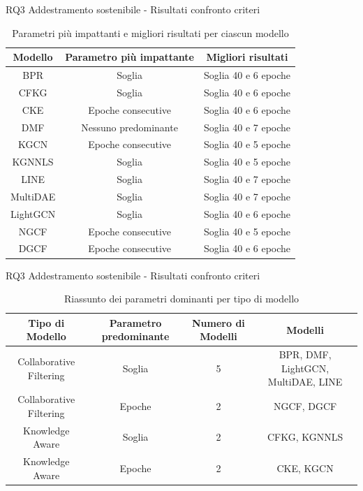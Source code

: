\begin{frame}{RQ3 Addestramento sostenibile - Risultati confronto criteri}
\begin{table}[H]
    \scriptsize
    \centering
    \begin{tabular}{|c|c|c|}
        \hline
        \textbf{Modello} & \textbf{Parametro più impattante} & \textbf{Migliori risultati} \\
        \hline
        BPR & Soglia & Soglia 40 e 6 epoche \\
        \hline
        CFKG & Soglia & Soglia 40 e 6 epoche \\
        \hline
        CKE & Epoche consecutive & Soglia 40 e 6 epoche \\
        \hline
        DMF & Nessuno predominante & Soglia 40 e 7 epoche \\
        \hline
        KGCN & Epoche consecutive & Soglia 40 e 5 epoche \\
        \hline
        KGNNLS & Soglia & Soglia 40 e 5 epoche \\
        \hline
        LINE & Soglia & Soglia 40 e 7 epoche \\
        \hline
        MultiDAE & Soglia & Soglia 40 e 7 epoche \\
        \hline
        LightGCN & Soglia & Soglia 40 e 6 epoche \\
        \hline
        NGCF & Epoche consecutive & Soglia 40 e 5 epoche \\
        \hline
        DGCF & Epoche consecutive & Soglia 40 e 6 epoche \\
        \hline
    \end{tabular}
    \caption{Parametri più impattanti e migliori risultati per ciascun modello}
\end{table}
\end{frame}


\begin{frame}{RQ3 Addestramento sostenibile - Risultati confronto criteri}
\begin{table}[H]
    \scriptsize
    \centering
        \begin{tabular}{|c|c|c|c|}
            \hline
            \textbf{Tipo di Modello} & \textbf{Parametro predominante} & \textbf{Numero di Modelli} & \textbf{Modelli} \\ \hline
            Collaborative Filtering & Soglia & 5 & BPR, DMF, LightGCN, MultiDAE, LINE \\ \hline
            Collaborative Filtering & Epoche & 2 & NGCF, DGCF \\ \hline
            Knowledge Aware & Soglia & 2 & CFKG, KGNNLS \\ \hline
            Knowledge Aware & Epoche & 2 & CKE, KGCN \\ \hline
        \end{tabular}
    \caption{Riassunto dei parametri dominanti per tipo di modello}
\end{table}

\end{frame}